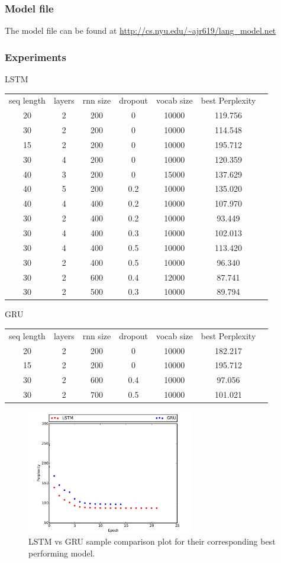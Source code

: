 \documentclass{article}
\begin{document}
\subsubsection{Model file}
The model file can be found at \url{http://cs.nyu.edu/~ajr619/lang\_model.net}

\subsubsection{Experiments}
LSTM
\begin{center}
\begin{tabular}{c c c c c c c} 
seq length & layers & rnn size & dropout  & vocab size & best Perplexity\\
 20 & 2 & 200 & 0 &  10000 & 119.756\\ 
 30 & 2 & 200 & 0 &  10000 & 114.548\\ 
 15 & 2 & 200 & 0 &  10000 & 195.712\\ 
  30 & 4 & 200 & 0 & 10000 & 120.359\\
  40 & 3 & 200 & 0 & 15000 & 137.629\\
 40 & 5 & 200 & 0.2 & 10000 & 135.020\\
 40 & 4 & 400 & 0.2 & 10000 & 107.970\\
 30 & 2 & 400 & 0.2 & 10000 & 93.449\\
 30 & 4 & 400 & 0.3 & 10000 & 102.013\\
  30 & 4 & 400 & 0.5 & 10000 & 113.420\\
  
  30 & 2 & 400 & 0.5 &  10000 & 96.340\\
  30 & 2 & 600 & 0.4 &  12000 & 87.741\\  
  30 & 2 & 500 & 0.3 &  10000 & 89.794\\  
   
\end{tabular}
\end{center}

GRU

\begin{center}
\begin{tabular}{c c c c c c c} 
seq length & layers & rnn size & dropout & vocab size & best Perplexity\\
 20 & 2 & 200 & 0 &  10000 & 182.217\\ 
 15 & 2 & 200 & 0 &  10000 & 195.712\\ 
 30 & 2 & 600 & 0.4 &  10000 & 97.056\\
 30 & 2 & 700 & 0.5 & 10000 & 101.021\\  
\end{tabular}
\end{center}

\begin{figure}[ht!]
  \centering
  \includegraphics[width=0.65\textwidth]{lstmvsgru}
  \caption{LSTM vs GRU sample comparison plot for their corresponding best performing model.\label{fig:gru_cell}}
\end{figure}
\end{document}
